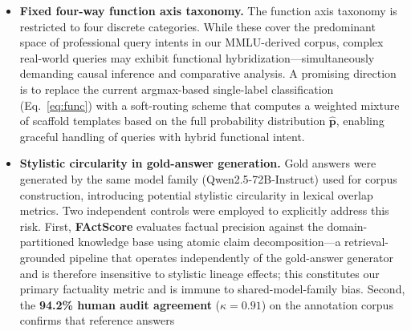 \documentclass[a4paper,fleql]{cas-sc}
\begin{document}
\begin{itemize}
interdisciplinary queries. The sensitivity analysis (Figure~\ref{fig:sensitivity})
indicates that the architecture operates within a stable plateau ($< 0.7$\%p
variation) on the current evaluation set, though deployment in strongly
out-of-distribution environments may warrant further calibration. Two concrete directions address this. First, an evidence-aware router would
condition its domain and function decision not only on the query but also on
the distribution of retrieved candidate passages, performing a lightweight
evidence-alignment check before committing to a final routing decision.
Second, hard thresholds could be replaced with calibrated confidence
estimation---for example, temperature scaling validated via reliability
diagrams---so the system reports routing uncertainty rather than a binary
$(\tau, \delta)$ decision.
The current framework applies a single global $(\tau, \delta)$ pair across all
domains; domain-conditional thresholds could potentially recover STEM
routing accuracy without sacrificing CROSS recall, and are left to
future work.
\item \textbf{Fixed four-way function axis taxonomy.} The function axis taxonomy is restricted to four discrete categories.
While these cover the predominant space of professional query intents in
our MMLU-derived corpus, complex real-world queries may exhibit functional
hybridization---simultaneously demanding causal inference and comparative
analysis. A promising direction is to replace the current argmax-based
single-label classification (Eq.~\ref{eq:func}) with a soft-routing scheme
that computes a weighted mixture of scaffold templates based on the full
probability distribution $\hat{\mathbf{p}}$, enabling graceful handling of
queries with hybrid functional intent.
\item \textbf{Stylistic circularity in gold-answer generation.} Gold answers were generated by the same model family (Qwen2.5-72B-Instruct)
used for corpus construction, introducing potential stylistic circularity in
lexical overlap metrics. Two independent controls were employed to explicitly
address this risk. First, \textbf{FActScore} evaluates factual precision
against the domain-partitioned knowledge base using atomic claim
decomposition---a retrieval-grounded pipeline that operates independently of
the gold-answer generator and is therefore insensitive to stylistic lineage
effects; this constitutes our primary factuality metric and is immune to
shared-model-family bias. Second, the \textbf{94.2\% human audit agreement}
($\kappa = 0.91$) on the annotation corpus confirms that reference answers

\end{itemize}
\end{document}
